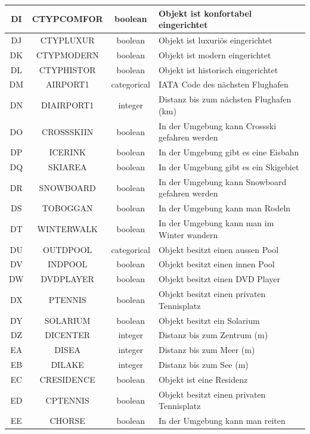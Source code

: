 \begin{longtable}{ | c | c | c | L{7.5cm} | }
	DI & CTYPCOMFOR & boolean & Objekt ist konfortabel eingerichtet \\ \hline 
	DJ & CTYPLUXUR & boolean & Objekt ist luxuriös eingerichtet \\ \hline 
	DK & CTYPMODERN & boolean & Objekt ist modern eingerichtet \\ \hline 
	DL & CTYPHISTOR & boolean & Objekt ist historisch eingerichtet \\ \hline 
	DM & AIRPORT1 & categorical & IATA Code des nächsten Flughafen \\ \hline 
	DN & DIAIRPORT1 & integer & Distanz bis zum nächsten Flughafen (km) \\ \hline 
	DO & CROSSSKIIN & boolean & In der Umgebung kann Crossski gefahren werden \\ \hline 
	DP & ICERINK & boolean & In der Umgebung gibt es eine Eisbahn \\ \hline 
	DQ & SKIAREA & boolean & In der Umgebung gibt es ein Skigebiet \\ \hline 
	DR & SNOWBOARD & boolean & In der Umgebung kann Snowboard gefahren werden \\ \hline 
	DS & TOBOGGAN & boolean & In der Umgebung kann man Rodeln \\ \hline 
	DT & WINTERWALK & boolean & In der Umgebung kann man im Winter wandern \\ \hline 
	DU & OUTDPOOL & categorical & Objekt besitzt einen aussen Pool \\ \hline 
	DV & INDPOOL & boolean & Objekt besitzt einen innen Pool \\ \hline 
	DW & DVDPLAYER & boolean & Objekt besitzt einen DVD Player \\ \hline 
	DX & PTENNIS & boolean & Objekt besitzt einen privaten Tennisplatz \\ \hline 
	DY & SOLARIUM & boolean & Objekt besitzt ein Solarium \\ \hline 
	DZ & DICENTER & integer & Distanz bis zum Zentrum (m) \\ \hline 
	EA & DISEA & integer & Distanz bis zum Meer (m) \\ \hline 
	EB & DILAKE & integer & Distanz bis zum See (m) \\ \hline 
	EC & CRESIDENCE & boolean & Objekt ist eine Residenz \\ \hline 
	ED & CPTENNIS & boolean & Objekt besitzt einen privaten Tennisplatz \\ \hline 
	EE & CHORSE & boolean & In der Umgebung kann man reiten \\ \hline 

\end{longtable}
